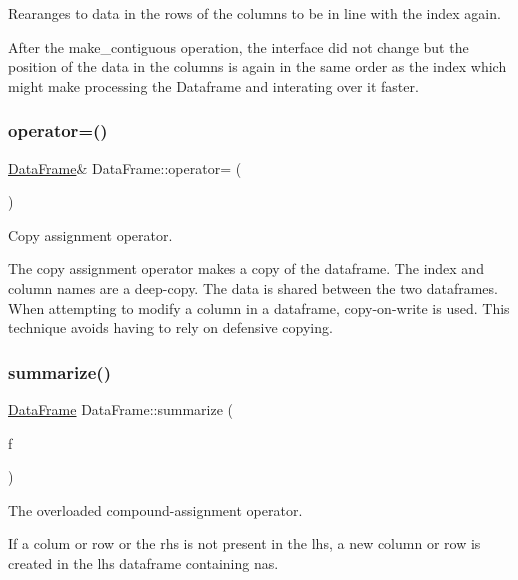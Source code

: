 Rearanges to data in the rows of the columns to be in line with the index again. 

After the make\+\_\+contiguous operation, the interface did not change but the position of the data in the columns is again in the same order as the index which might make processing the Dataframe and interating over it faster. \mbox{\label{classDataFrame_a26164d4d8119ea34da73eb0c48bd3972}} 
\subsubsection{\texorpdfstring{operator=()}{operator=()}}
{\footnotesize\ttfamily \hyperlink{classDataFrame}{Data\+Frame}\& Data\+Frame\+::operator= (\begin{DoxyParamCaption}\item[{const \hyperlink{classDataFrame}{Data\+Frame} \&}]{ }\end{DoxyParamCaption})\hspace{0.3cm}{\ttfamily [default]}}



Copy assignment operator. 

The copy assignment operator makes a copy of the dataframe. The index and column names are a deep-\/copy. The data is shared between the two dataframes. When attempting to modify a column in a dataframe, copy-\/on-\/write is used. This technique avoids having to rely on defensive copying. \mbox{\label{classDataFrame_aa701d85cc361dca2ebdd13d4c6d3d4fd}} 
\subsubsection{\texorpdfstring{summarize()}{summarize()}}
{\footnotesize\ttfamily \hyperlink{classDataFrame}{Data\+Frame} Data\+Frame\+::summarize (\begin{DoxyParamCaption}\item[{\hyperlink{classStatistic}{Statistic} $\ast$}]{f }\end{DoxyParamCaption})}



The overloaded compound-\/assignment operator. 

If a colum or row or the rhs is not present in the lhs, a new column or row is created in the lhs dataframe containing nas. 

